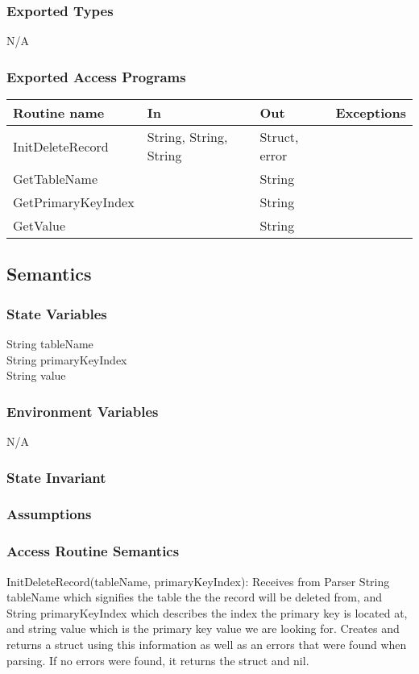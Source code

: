\documentclass[12pt]{article}
\begin{document}
\subsubsection {Exported Types}
N/A

\subsubsection {Exported Access Programs}

\begin{tabular}{| l | l | l | l |}
\hline
\textbf{Routine name} & \textbf{In} & \textbf{Out} & \textbf{Exceptions}\\
\hline
InitDeleteRecord & String, String, String & Struct, error & \\
\hline
GetTableName & & String & \\
\hline
GetPrimaryKeyIndex & & String & \\
\hline
GetValue & & String & \\
\hline
\end{tabular}

\subsection {Semantics}

\subsubsection {State Variables}
String tableName\\
String primaryKeyIndex \\
String value\\

\subsubsection {Environment Variables}
N/A

\subsubsection {State Invariant}

\subsubsection {Assumptions}

\subsubsection {Access Routine Semantics}
\noindent InitDeleteRecord(tableName, primaryKeyIndex): Receives from Parser String tableName which signifies the table the the record will be deleted from, and String primaryKeyIndex which describes the index the primary key is located at, and string value which is the primary key value we are looking for. Creates and returns a struct using this information as well as an errors that were found when parsing. If no errors were found, it returns the struct and nil.\\
\end{document}
